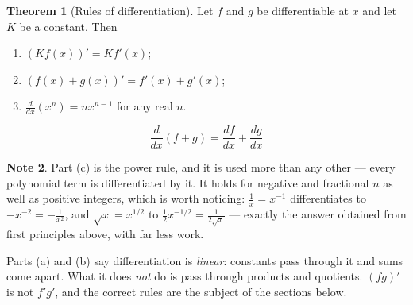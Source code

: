 \documentclass[11pt,a4paper]{article}
\theoremstyle{definition}
\newtheorem{thm}{Theorem}[section]
\newtheorem{note}[thm]{Note}
\begin{document}
\begin{thm}[Rules of differentiation]
Let $f$ and $g$ be differentiable at $x$ and let $K$ be a constant. Then
\begin{enumerate}
\item[(a).] $\left(K f(x)\right)'=K f'(x)$;
\item[(b).] $\left(f(x)+g(x)\right)'=f'(x)+g'(x)$;
\item[(c).] $\frac{d}{dx}\left(x^{n}\right)=n x^{n-1}$ for any real $n$.
\end{enumerate}
\end{thm}

$$\frac{d}{dx}(f+g) = \frac{df}{dx}+\frac{dg}{dx}$$

\begin{note}
Part (c) is the power rule, and it is used more than any other --- every polynomial
term is differentiated by it. It holds for negative and fractional $n$ as well as
positive integers, which is worth noticing: $\frac{1}{x}=x^{-1}$ differentiates to
$-x^{-2}=-\frac{1}{x^{2}}$, and $\sqrt{x}=x^{1/2}$ to
$\frac{1}{2}x^{-1/2}=\frac{1}{2\sqrt{x}}$ --- exactly the answer obtained from first
principles above, with far less work.

Parts (a) and (b) say differentiation is \emph{linear}: constants pass through it
and sums come apart. What it does \emph{not} do is pass through products and
quotients. $(fg)'$ is not $f'g'$, and the correct rules are the subject of the
sections below.
\end{note}
\end{document}

